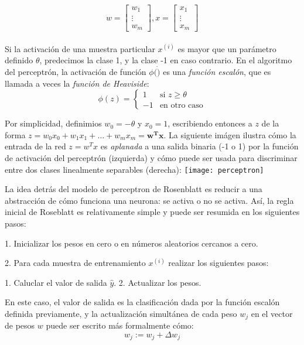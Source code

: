 \begin{equation*}
w=
    \begin{bmatrix}
        w_1 \\
        \vdots \\
        w_m
    \end{bmatrix}
    , x=
    \begin{bmatrix}
      x_1 \\
      \vdots \\
      x_m
    \end{bmatrix}
\end{equation*}
\\
Si la activación de una muestra particular $x^{(i)}$ es mayor que un parámetro definido
$\theta$, predecimos la clase 1, y la clase -1 en caso contrario. En el algoritmo
del perceptrón, la activación de función $\phi (\dot)$ es una \textit{función escalón},
que es llamada a veces la \textit{función de Heaviside}:
\begin{equation*}
  \phi(z)= \left\{ \begin{array} {rl}
    1 & \text{si } z \geq \theta \\
    -1 & \text{en otro caso} \end{array} \right.
\end{equation*}

Por simplicidad, definimios $w_0=-\theta$ y $x_0=1$, escribiendo entonces a $z$ de la
forma $z=w_0x_0 + w_1x_1 + \dots + w_mx_m = \mathbf{w^Tx}$.
La siguiente imágen ilustra cómo la entrada de la red $z=w^Tx$ es \textit{aplanada}
a una salida binaria (-1 o 1) por la función de activación del perceptrón (izquierda)
y cómo puede ser usada para discriminar entre dos clases linealmente separables (derecha):
\texttt{[image: perceptron]}

La idea detrás del modelo de perceptron de Rosenblatt es reducir a una abstracción de cómo funciona
una neurona: se activa o no se activa. Así, la regla inicial de Roseblatt es relativamente
simple y puede ser resumida en los siguientes pasos:

1. Inicializar los pesos en cero o en números aleatorios cercanos a cero.

2. Para cada muestra de entrenamiento $x^{(i)}$ realizar los siguientes pasos:

1. Caluclar el valor de salida $\hat y$.
2. Actualizar los pesos.


En este caso, el valor de salida es la clasificación dada por la función escalón
definida previamente, y la actualización simultánea de cada peso $w_j$ en el
vector de pesos $w$ puede ser escrito más formalmente cómo:
\begin{equation}
  w_j := w_j + \Delta w_j
\end{equation}

